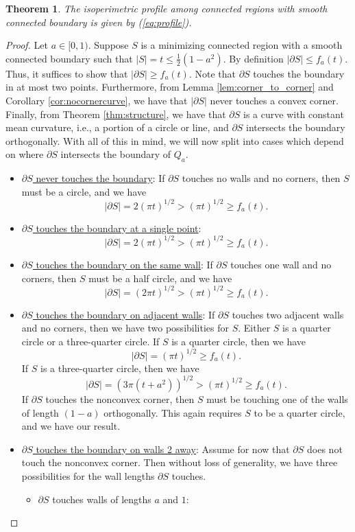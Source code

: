\documentclass[leqno]{article}
\numberwithin{equation}{section}
\newtheorem{theorem}[equation]{Theorem}
\theoremstyle{definition}
\theoremstyle{remark}
\theoremstyle{plain}
\begin{document}
{\color{gray}\begin{theorem}\label{thm:fconnectR1boundary}  The isoperimetric profile among connected regions with smooth connected boundary is given by (\ref{eq:profile}).


\end{theorem}

\begin{proof}

Let $a \in [0,1)$. Suppose $S$ is a minimizing connected region with a smooth connected boundary such that $|S| = t \leq \frac{1}{2}(1-a^2)$. By definition $|\partial S| \leq f_a(t)$. Thus, it suffices to show that $|\partial S| \geq f_a(t)$. Note that $\partial S$ touches the boundary in at most two points. Furthermore, from Lemma \ref{lem:corner_to_corner} and Corollary \ref{cor:nocornercurve}, we have that $|\partial S|$ never touches a convex corner. Finally, from Theorem \ref{thm:structure},  we have that $\partial S$ is a curve with constant mean curvature, i.e., a portion of a circle or line, and $\partial S$ intersects the boundary orthogonally. With all of this in mind, we will now split into cases which depend on where $\partial S$ intersects the boundary of $Q_a$.
\begin{itemize}
    \item \underline{$\partial S$ never touches the boundary}: If $\partial S$ touches no walls and no corners, then $S$ must be a circle, and we have
    \[
        |\partial S| = 2(\pi t)^{1/2} > (\pi t)^{1/2} \geq f_a(t).
    \]
    \item \underline{$\partial S$ touches the boundary at a single point}: 
    \[
        |\partial S| = 2(\pi t)^{1/2} > (\pi t)^{1/2} \geq f_a(t).
    \]
    \item \underline{$\partial S$ touches the boundary on the same wall}: If $\partial S$ touches one wall and no corners, then $S$ must be a half circle, and we have
    \[
        |\partial S| = (2\pi t)^{1/2} > (\pi t)^{1/2} \geq f_a(t).
    \]
    \item \underline{$\partial S$ touches the boundary on adjacent walls}: If $\partial S$ touches two adjacent walls and no corners, then we have two possibilities for $S$. Either $S$ is a quarter circle or a three-quarter circle. If $S$ is a quarter circle, then we have
    \[
        |\partial S| = (\pi t)^{1/2} \geq f_a(t).
    \]
    If $S$ is a three-quarter circle, then we have
    \[
        |\partial S| = (3\pi( t+a^2))^{1/2} > (\pi t)^{1/2} \geq f_a(t).
    \]
    If $\partial S$ touches the nonconvex corner, then $S$ must be touching one of the walls of length $(1-a)$ orthogonally. This again requires $S$ to be a quarter circle, and we have our result.
    \item \underline{$\partial S$ touches the boundary on walls 2 away}: Assume for now that $\partial S$ does not touch the nonconvex corner. Then without loss of generality, we have three possibilities for the wall lengths $\partial S$ touches.
    \begin{itemize}
        \item $\partial S$ touches walls of lengths $a$ and $1$:


\end{itemize}
\end{itemize}
\end{proof}}
\end{document}
